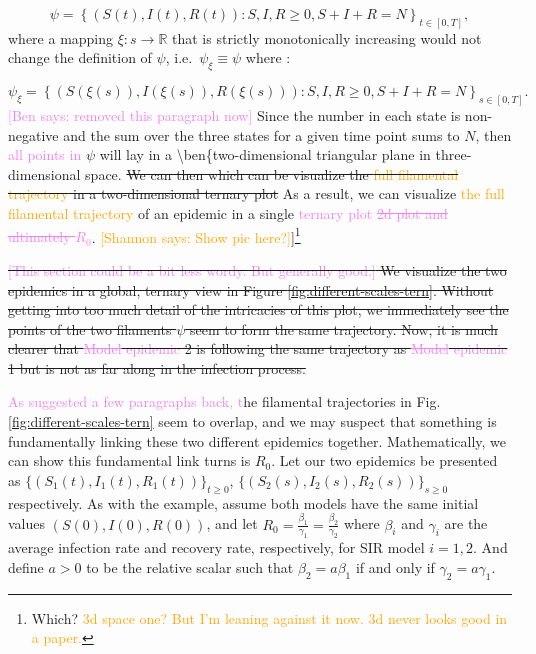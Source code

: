\documentclass[
  shortnames]{jss}
\begin{document}
\[
\psi = \left \{(S(t), I(t), R(t)): S, I, R \ge 0, S + I + R = N \right \}_{t\in[0,T]},
\] where a mapping \(\xi : s \to \mathbb{R}\) that is strictly
monotonically increasing would not change the definition of \(\psi\),
i.e.~\(\psi_\xi \equiv \psi\) where :

\[
\psi_\xi = \left \{(S(\xi(s)), I(\xi(s)), R(\xi(s))): S, I, R \ge 0, S + I + R = N \right \}_{s\in[0,T]}.
\] \textcolor{violet}{[Ben says: removed this paragraph now]} Since the
number in each state is non-negative and the sum over the three states
for a given time point sums to \(N\), then
\textcolor{violet}{all points in} \(\psi\) will lay in a
\textbackslash ben\{two-dimensional triangular plane in
three-dimensional space.
\sout{We can then which can be visualize the \textcolor{orange}{full filamental trajectory} in a two-dimensional ternary plot}
As a result, we can visualize
\textcolor{orange}{the full filamental trajectory} of an epidemic in a
single
\textcolor{violet}{ternary plot \sout{2d plot and ultimately $R_0$}}.
\textcolor{orange}{[Shannon says: Show pic here?]}{]}\footnote{Which?  \textcolor{orange}{3d space one? But I'm leaning against it now.   3d never looks good in a paper.}}

\sout{\textcolor{violet}{[This section could be a bit less wordy. But generally good.]} We visualize the two epidemics in a global, ternary view in Figure \ref{fig:different-scales-tern}.  Without getting into too much detail of the intricacies of this plot, we immediately see the points of the two filaments $\psi$ seem to form the same trajectory.  Now, it is much clearer that \textcolor{violet}{\sout{Model} epidemic} 2 is following the same trajectory as \textcolor{violet}{\sout{Model} epidemic} 1 but is not as far along in the infection process. }

\textcolor{violet}{As suggested a few paragraphs back, t}he filamental
trajectories in Fig. \ref{fig:different-scales-tern} seem to overlap,
and we may suspect that something is fundamentally linking these two
different epidemics together. Mathematically, we can show this
fundamental link turns is \(R_0\). Let our two epidemics be presented as
\(\{(S_1(t), I_1(t), R_1(t))\}_{t\geq0}\),
\(\{(S_2(s), I_2(s), R_2(s))\}_{s \geq 0}\) respectively. As with the
example, assume both models have the same initial values
\((S(0), I(0), R(0))\), and let
\(R_0 =\frac{\beta_1}{\gamma_1} = \frac{\beta_2}{\gamma_2}\) where
\(\beta_i\) and \(\gamma_i\) are the average infection rate and recovery
rate, respectively, for SIR model \(i=1, 2\). And define \(a>0\) to be
the relative scalar such that \(\beta_2 = a \beta_1\) if and only if
\(\gamma_2 = a \gamma_1\).
\end{document}
